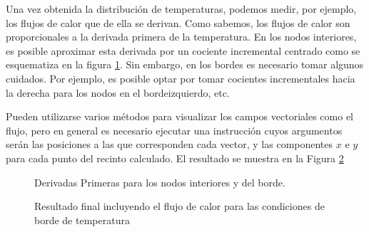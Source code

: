 
Una vez obtenida la distribución de temperaturas,
podemos medir, por ejemplo, los flujos de calor 
que de ella se derivan.  Como sabemos, los flujos de
calor son proporcionales a la derivada primera de 
la temperatura. En los nodos interiores, es posible
aproximar esta derivada por un cociente incremental
centrado como se esquematiza en la figura \ref{FiguraFlujosCalorAdentro}.
 Sin embargo, en los bordes es necesario tomar
 algunos cuidados. Por ejemplo, es posible optar
 por tomar cocientes incrementales hacia la derecha
 para los nodos en el bordeizquierdo, etc. 

Pueden utilizarse varios métodos para visualizar 
los campos vectoriales como el flujo, pero en 
general es necesario ejecutar una instrucción 
cuyos argumentos serán las posiciones a las que
corresponden cada vector, y las componentes 
$x$ e $y$ para cada punto del recinto calculado.
El resultado se muestra en la Figura \ref{FiguraResultadosFlujos}

\begin{figure}
  \caption{Derivadas Primeras para los nodos interiores 
  y del borde. \label{FiguraFlujosCalorAdentro}}
\end{figure}

\begin{figure}
  \caption{Resultado final incluyendo el flujo de calor para 
  las condiciones de borde de temperatura \label{FiguraResultadosFlujos}
  }
\end{figure}

